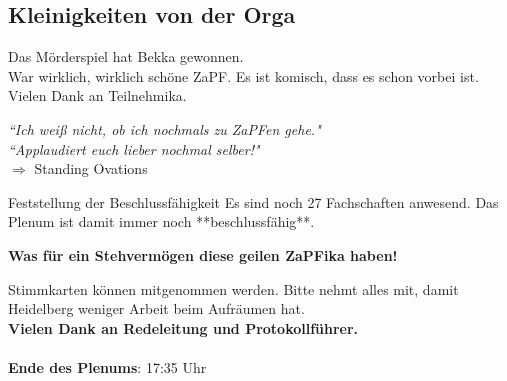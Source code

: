   \subsection{Kleinigkeiten von der Orga}
    Das Mörderspiel hat Bekka gewonnen. \\

    War wirklich, wirklich schöne ZaPF. Es ist komisch, dass es schon vorbei ist.
    Vielen Dank an Teilnehmika. \\

    \begin{center}
      \textit{``Ich weiß nicht, ob ich nochmals zu ZaPFen gehe."} \\
      \textit{``Applaudiert euch lieber nochmal selber!"} \\
      $\Rightarrow$ Standing Ovations
    \end{center}

    \begin{success}{Feststellung der Beschlussfähigkeit}
      Es sind noch 27 Fachschaften anwesend.
      Das Plenum ist damit immer noch **beschlussfähig**.
      \begin{center}
        \textbf{Was für ein Stehvermögen diese geilen ZaPFika haben!}
      \end{center}
    \end{success}

    Stimmkarten können mitgenommen werden. Bitte nehmt alles mit, damit Heidelberg weniger Arbeit beim Aufräumen hat. \\

    \textbf{Vielen Dank an Redeleitung und Protokollführer.} \\ \\

    \textbf{Ende des Plenums}: 17:35 Uhr
